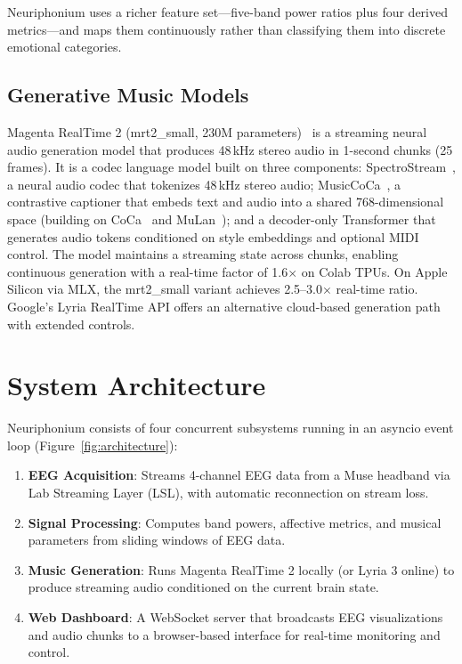 \documentclass[manuscript,review,anonymous]{acmart}
\begin{document}
Neuriphonium uses a richer feature set---five-band power ratios plus four derived metrics---and maps them continuously rather than classifying them into discrete emotional categories.

\subsection{Generative Music Models}

Magenta RealTime 2 (mrt2\_small, 230M parameters)~\cite{livemusicmodels} is a streaming neural audio generation model that produces 48\,kHz stereo audio in 1-second chunks (25 frames). It is a codec language model built on three components: SpectroStream~\cite{spectrostream}, a neural audio codec that tokenizes 48\,kHz stereo audio; MusicCoCa~\cite{livemusicmodels}, a contrastive captioner that embeds text and audio into a shared 768-dimensional space (building on CoCa~\cite{coca} and MuLan~\cite{mulan}); and a decoder-only Transformer that generates audio tokens conditioned on style embeddings and optional MIDI control. The model maintains a streaming state across chunks, enabling continuous generation with a real-time factor of 1.6$\times$ on Colab TPUs. On Apple Silicon via MLX, the mrt2\_small variant achieves 2.5--3.0$\times$ real-time ratio. Google's Lyria RealTime API offers an alternative cloud-based generation path with extended controls.

\section{System Architecture}

Neuriphonium consists of four concurrent subsystems running in an asyncio event loop (Figure~\ref{fig:architecture}):

\begin{enumerate}[nosep]
  \item \textbf{EEG Acquisition}: Streams 4-channel EEG data from a Muse headband via Lab Streaming Layer (LSL), with automatic reconnection on stream loss.
  \item \textbf{Signal Processing}: Computes band powers, affective metrics, and musical parameters from sliding windows of EEG data.
  \item \textbf{Music Generation}: Runs Magenta RealTime 2 locally (or Lyria 3 online) to produce streaming audio conditioned on the current brain state.
  \item \textbf{Web Dashboard}: A WebSocket server that broadcasts EEG visualizations and audio chunks to a browser-based interface for real-time monitoring and control.
\end{enumerate}
\end{document}
